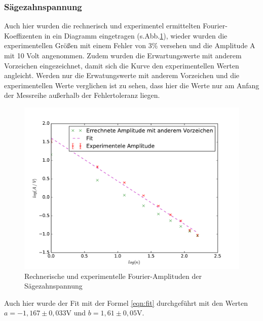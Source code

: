 \subsubsection{Sägezahnspannung}
Auch hier wurden die rechnerisch und experimentel ermittelten Fourier-Koeffizenten in
ein Diagramm eingetragen (s.Abb.\ref{fig:dp}), wieder wurden
die experimentellen Größen mit einem Fehler von 3\% versehen und die Amplitude A mit 10 Volt
angenommen.
Zudem wurden die Erwartungswerte mit anderem Vorzeichen eingezeichnet, damit sich die
 Kurve den experimentellen Werten angleicht.
Werden nur die Erwatungswerte mit anderem Vorzeichen und die experimentellen Werte verglichen
 ist zu sehen, dass hier die Werte nur am Anfang der Messreihe außerhalb der Fehlertoleranz liegen.
\begin{figure}
  \centering
  \includegraphics[width= \textwidth]{Plots/Dreieckplot.pdf}
  \caption{Rechnerische und experimentelle Fourier-Amplituden der Sägezahnspannung}
  \label{fig:dp}
\end{figure}
\FloatBarrier
Auch hier wurde der Fit mit der Formel \eqref{eqn:fit} durchgeführt mit den Werten
$a = -1,167 \pm 0,033 $V und $ b = 1,61 \pm 0,05 $V.
